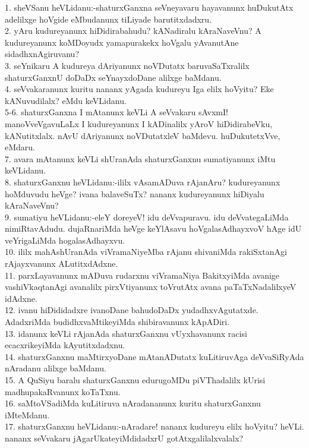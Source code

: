 \documentclass{article}
\begin{document}
1. sheVSanu heVLidanu:-shaturxGanxna seVneyavaru hayavanunx huDukutAtx adelilxge hoVgide eMbudanunx tiLiyade barutitxdadxru.\\
2. yAru kudureyanunx hiDidirabahudu? kANadiralu kAraNaveVnu? A kudureyanunx koMDoyudx yamapurakekx hoVgalu yAvanutAne sidadhxnAgiruvanu?\\
3. seYnikaru A kudureya dAriyanunx noVDutatx baruvaSaTxralilx shaturxGanxnU doDaDx seYnayxdoDane alilxge baMdanu.\\
4. seVvakaranunx kuritu nananx yAgada kudureyu Iga elilx hoVyitu? Eke kANuvudilalx? eMdu keVLidanu.\\
5-6. shaturxGanxna I mAtanunx keVLi A seVvakaru sAvxmI! manoVveVgavuLaLx I kudureyanunx I kADinalilx yAroV hiDidirabeVku, kANutitxlalx. nAvU dAriyanunx noVDutatxleV baMdevu. huDukutetxVve, eMdaru.\\
7. avara mAtanunx keVLi shUranAda shaturxGanxnu sumatiyanunx iMtu keVLidanu.\\
8. shaturxGanxnu heVLidanu:-ililx vAsamADuva rAjanAru? kudureyanunx hoMduvudu heVge? ivana balaveSuTx? nananx kudureyanunx hiDiyalu kAraNaveVnu?\\
9. sumatiyu heVLidanu:-eleY doreyeV! idu deVvapuravu. idu deVvategaLiMda nimiRtavAdudu. dujaRnariMda  heVge keYlAsavu hoVgalasAdhayxvoV hAge idU veYrigaLiMda hogalasAdhayxvu.\\
10. ililx mahAshUranAda viVramaNiyeMba rAjanu shivaniMda rakiSxtanAgi rAjayxvanunx ALutitxdAdxne.\\
11. parxLayavanunx mADuva rudarxnu viVramaNiya BakitxyiMda avanige vashiVkaqtanAgi avanalilx pirxVtiyanunx toVrutAtx avana paTaTxNadalilxyeV idAdxne.\\
12. ivanu hiDididadxre ivanoDane bahudoDaDx yudadhxvAgutatxde. AdadxriMda budidhxvaMtikeyiMda shibiravanunx kApADiri.\\
13. idanunx keVLi rAjanAda shaturxGanxnu vUyxhavanunx racisi ecacxrikeyiMda kAyutitxdadxnu.\\
14. shaturxGanxnu maMtirxyoDane mAtanADutatx kuLitiruvAga deVvaSiRyAda nAradanu alilxge baMdanu.\\
15. A QuSiyu baralu shaturxGanxnu edurugoMDu piVThadalilx kUrisi madhupakaRvanunx koTaTxnu.\\
16. saMtoVSadiMda kuLitiruva nAradananunx kuritu shaturxGanxnu iMteMdanu.\\
17. shaturxGanxnu heVLidanu:-nAradare! nananx kudureyu elilx hoVyitu? heVLi. nananx seVvakaru jAgarUkateyiMdidadxrU gotAtxgalilalxvalalx?\\
\end{document}
